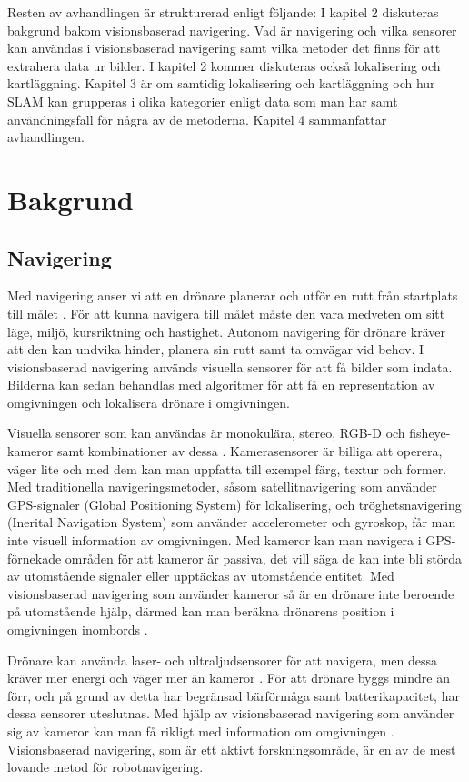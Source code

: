 Resten av avhandlingen är strukturerad enligt följande: I kapitel 2 diskuteras bakgrund bakom visionsbaserad navigering. Vad är navigering och vilka sensorer kan användas i visionsbaserad navigering samt vilka metoder det finns för att extrahera data ur bilder. I kapitel 2 kommer diskuteras också lokalisering och kartläggning. Kapitel 3 är om samtidig lokalisering och kartläggning och hur SLAM kan grupperas i olika kategorier enligt data som man har samt användningsfall för några av de metoderna. Kapitel 4 sammanfattar avhandlingen.

\chapter{Bakgrund}

\section{Navigering}

Med navigering anser vi att en drönare planerar och utför en rutt från startplats till målet \citep{geospatial}. För att kunna navigera till målet måste den vara medveten om sitt läge, miljö, kursriktning och hastighet. Autonom navigering för drönare kräver att den kan undvika hinder, planera sin rutt samt ta omvägar vid behov. I visionsbaserad navigering används visuella sensorer för att få bilder som indata. Bilderna kan sedan behandlas med algoritmer för att få en representation av omgivningen och lokalisera drönare i omgivningen. 

Visuella sensorer som kan användas är monokulära, stereo, RGB-D och fisheye-kameror samt kombinationer av dessa \citep{geospatial}. Kamerasensorer är billiga att operera, väger lite och med dem kan man uppfatta till exempel färg, textur och former. Med traditionella navigeringsmetoder, såsom satellitnavigering som använder GPS-signaler (Global Positioning System) för lokalisering, och tröghetsnavigering (Inerital Navigation System) som använder accelerometer och gyroskop, får man inte visuell information av omgivningen. Med kameror kan man navigera i GPS-förnekade områden för att kameror är passiva, det vill säga de kan inte bli störda av utomstående signaler eller upptäckas av utomstående entitet. Med visionsbaserad navigering som använder kameror så är en drönare inte beroende på utomstående hjälp, därmed kan man beräkna drönarens position i omgivningen inombords \citep{opticalflowuav}.

Drönare kan använda laser- och ultraljudsensorer för att navigera, men dessa kräver mer energi och väger mer än kameror \citep{6385934}. För att drönare byggs mindre än förr, och på grund av detta har begränsad bärförmåga samt batterikapacitet, har dessa sensorer uteslutnas. Med hjälp av visionsbaserad navigering som använder sig av kameror kan man få rikligt med information om omgivningen \citep{geospatial}. Visionsbaserad navigering, som är ett aktivt forskningsområde, är en av de mest lovande metod för robotnavigering.

